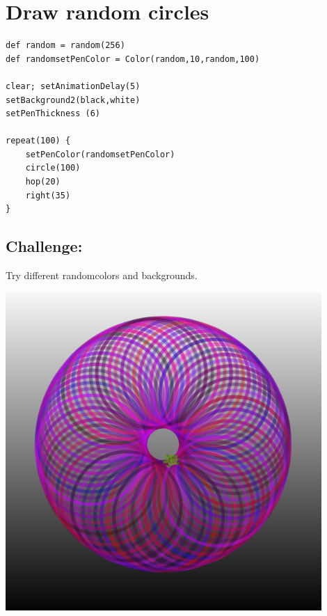 \chapter{Draw random circles}
\begin{multicols}{2}

\begin{lstlisting}[basicstyle={\ttfamily\fontsize{16}{19}\selectfont},numbers=none]
def random = random(256)
def randomsetPenColor = Color(random,10,random,100) 

clear; setAnimationDelay(5)
setBackground2(black,white)
setPenThickness (6)

repeat(100) {
    setPenColor(randomsetPenColor)
    circle(100)
    hop(20)
    right(35)
}
\end{lstlisting}
        
\section*{\color{BrickRed}Challenge:}
Try different randomcolors and backgrounds.


\columnbreak


\begin{center}
\includegraphics[width=12.0cm]{../img/circle-of-circles.png}
\end{center}

\end{multicols}

